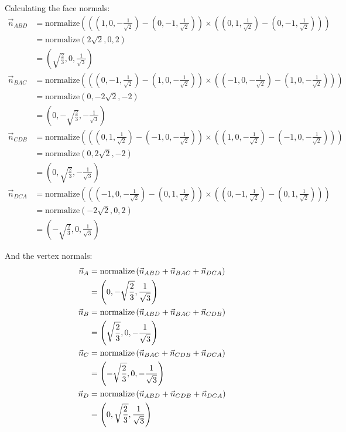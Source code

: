 \documentclass[11pt, oneside]{article}
\begin{document}
\begin{enumerate}[Q1.]
  Calculating the face normals:
  \begin{align*}
    \vec{n}_{ABD} &= \mathrm{normalize}\left(\left(\left(1,0,-\frac 1 {\sqrt 2}\right) - \left(0,-1,\frac 1 {\sqrt 2} \right)\right)\times\left(\left(0,1,\frac 1 {\sqrt 2}\right) - \left(0,-1,\frac 1 {\sqrt 2} \right)\right)\right)\\
                  &= \mathrm{normalize}\left(2\sqrt 2, 0, 2\right)\\
                  &= \left(\sqrt{\frac 2 3}, 0, \frac 1 {\sqrt 3}\right)\\
    \vec{n}_{BAC} &= \mathrm{normalize}\left(\left(\left(0,-1,\frac 1 {\sqrt 2}\right) - \left(1,0,-\frac 1 {\sqrt 2} \right)\right)\times\left(\left(-1,0,-\frac 1 {\sqrt 2}\right) - \left(1,0,-\frac 1 {\sqrt 2} \right)\right)\right)\\
                  &= \mathrm{normalize}\left(0,-2\sqrt 2, -2\right)\\
                  &= \left(0, -\sqrt{\frac 2 3}, -\frac 1 {\sqrt 3}\right)\\
    \vec{n}_{CDB} &= \mathrm{normalize}\left(\left(\left(0,1,\frac 1 {\sqrt 2}\right) - \left(-1,0,-\frac 1 {\sqrt 2} \right)\right)\times\left(\left(1,0,-\frac 1 {\sqrt 2}\right) - \left(-1,0,-\frac 1 {\sqrt 2} \right)\right)\right)\\
                  &= \mathrm{normalize}\left(0, 2\sqrt 2, -2\right)\\
                  &= \left(0, \sqrt{\frac 2 3}, -\frac 1 {\sqrt 3}\right)\\
    \vec{n}_{DCA} &= \mathrm{normalize}\left(\left(\left(-1,0,-\frac 1 {\sqrt 2}\right) - \left(0,1,\frac 1 {\sqrt 2} \right)\right)\times\left(\left(0,-1,\frac 1 {\sqrt 2}\right) - \left(0,1,\frac 1 {\sqrt 2} \right)\right)\right)\\
                  &= \mathrm{normalize}\left(-2\sqrt 2, 0, 2\right)\\
                  &= \left(-\sqrt{\frac 2 3}, 0, \frac 1 {\sqrt 3}\right)
  \end{align*}

  And the vertex normals:
  \begin{align*}
    \vec{n}_A &= \mathrm{normalize}\left(\vec{n}_{ABD} + \vec{n}_{BAC} + \vec{n}_{DCA}\right) \\
              &= \left(0, -\sqrt{\frac{2}{3}}, \frac 1 {\sqrt 3}\right)\\
    \vec{n}_B &= \mathrm{normalize}\left(\vec{n}_{ABD} + \vec{n}_{BAC} + \vec{n}_{CDB}\right) \\
              &= \left(\sqrt{\frac{2}{3}}, 0, -\frac 1 {\sqrt 3}\right)\\
    \vec{n}_C &= \mathrm{normalize}\left(\vec{n}_{BAC} + \vec{n}_{CDB} + \vec{n}_{DCA}\right) \\
              &= \left(-\sqrt{\frac{2}{3}}, 0, -\frac 1 {\sqrt 3}\right)\\
    \vec{n}_D &= \mathrm{normalize}\left(\vec{n}_{ABD} + \vec{n}_{CDB} + \vec{n}_{DCA}\right) \\
              &= \left(0, \sqrt{\frac{2}{3}}, \frac 1 {\sqrt 3}\right)
  \end{align*}


\end{enumerate}
\end{document}

